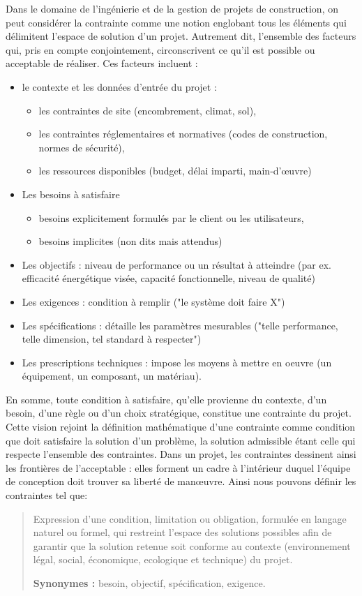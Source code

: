 \documentclass[a4paper,12pt]{article}
\begin{document}
Dans le domaine de l’ingénierie et de la gestion de projets de construction, on peut considérer la contrainte comme une notion englobant tous les éléments qui délimitent l’espace de solution d’un projet. Autrement dit, l’ensemble des facteurs qui, pris en compte conjointement, circonscrivent ce qu’il est possible ou acceptable de réaliser. Ces facteurs incluent :
\begin{itemize}
\item le contexte et les données d’entrée du projet :
\begin{itemize}
\item les contraintes de site (encombrement, climat, sol),
\item les contraintes réglementaires et normatives (codes de construction, normes de sécurité),
\item les ressources disponibles (budget, délai imparti, main-d’œuvre)
\end{itemize}
\item Les besoins à satisfaire
\begin{itemize}
\item besoins explicitement formulés par le client ou les utilisateurs,
\item besoins implicites (non dits mais attendus)
\end{itemize}
\item Les objectifs : niveau de performance ou un résultat à atteindre (par ex. efficacité énergétique visée, capacité fonctionnelle, niveau de qualité)
\item Les exigences : condition à remplir ("le système doit faire X")
\item Les spécifications : détaille les paramètres mesurables ("telle performance, telle dimension, tel standard à respecter")
\item Les prescriptions techniques : impose les moyens à mettre en oeuvre (un équipement, un composant, un matériau).
\end{itemize}

En somme, toute condition à satisfaire, qu’elle provienne du contexte, d’un besoin, d’une règle ou d’un choix stratégique, constitue une contrainte du projet. Cette vision rejoint la définition mathématique d’une contrainte comme condition que doit satisfaire la solution d’un problème, la solution admissible étant celle qui respecte l’ensemble des contraintes. Dans un projet, les contraintes dessinent ainsi les frontières de l’acceptable : elles forment un cadre à l’intérieur duquel l’équipe de conception doit trouver sa liberté de manœuvre. Ainsi nous pouvons définir les contraintes tel que:
\begin{verse}
Expression d'une condition, limitation ou obligation, formulée en langage naturel ou formel, qui restreint l’espace des solutions possibles afin de garantir que la solution retenue soit conforme au contexte (environnement légal, social, économique, ecologique et technique) du projet.

\textbf{Synonymes :} besoin, objectif, spécification, exigence.\\
\end{verse}
\end{document}
